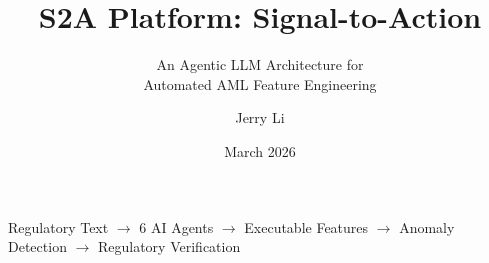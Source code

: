 \documentclass[10pt, aspectratio=169]{beamer}
\title{S2A Platform: Signal-to-Action}
\subtitle{An Agentic LLM Architecture for\\Automated AML Feature Engineering}
\author{Jerry Li}
\institute{AML Research Team \(\cdot\) Scotiabank}
\date{March 2026}
\begin{document}
\begin{frame}[plain]
  \maketitle
  \vspace{-1.5em}
  \begin{center}
    \colorbox{bgcard}{%
      \parbox{0.85\textwidth}{\centering\small\ttfamily\color{accentcyan}%
        Regulatory Text \(\to\) 6 AI Agents \(\to\) Executable Features \(\to\) Anomaly Detection \(\to\) Regulatory Verification%
      }%
    }
  \end{center}
\end{frame}
\end{document}
